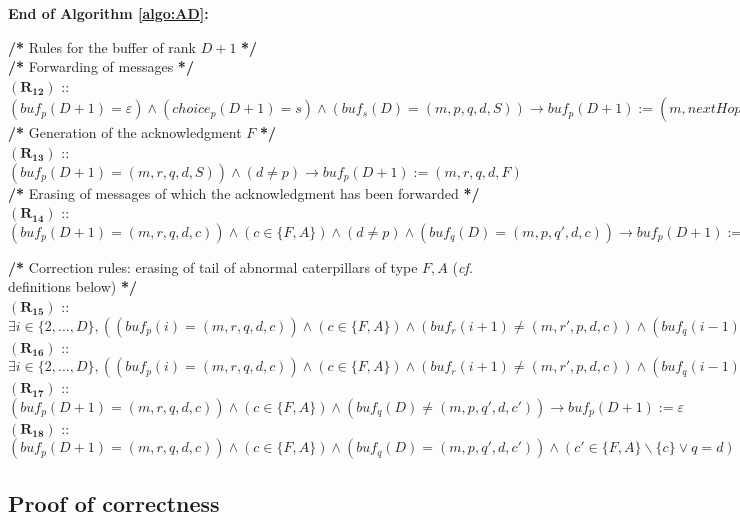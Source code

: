 \documentclass[11pt]{article}
\begin{document}
\begin{algorithm}
	\begin{description}
		\item \textbf{End of Algorithm \ref{algo:AD}:}
\small{
			\item \textbf{/*} Rules for the buffer of rank $D+1$ \textbf{*/}\\
			\textbf{/*} Forwarding of messages \textbf{*/}\\
			$\boldsymbol{(R_{12})}$ :: $(buf_{p}(D+1)=\varepsilon) \wedge (choice_{p}(D+1)=s) \wedge (buf_{s}(D)=(m,p,q,d,S))\longrightarrow buf_{p}(D+1):=(m,nextHop_{p}(d),s,d,S)$ 
			\textbf{/*} Generation of the acknowledgment $F$ \textbf{*/}\\
			$\boldsymbol{(R_{13})}$ :: $(buf_{p}(D+1)=(m,r,q,d,S)) \wedge (d\neq p)\longrightarrow buf_{p}(D+1):=(m,r,q,d,F)$ \\
			\textbf{/*} Erasing of messages of which the acknowledgment has been forwarded \textbf{*/}\\
			$\boldsymbol{(R_{14})}$ :: $(buf_{p}(D+1)=(m,r,q,d,c)) \wedge (c\in\{F,A\}) \wedge (d\neq p) \wedge (buf_{q}(D)=(m,p,q',d,c))\longrightarrow buf_{p}(D+1):=\varepsilon$ 
		\item \textbf{/*} Correction rules: erasing of tail of abnormal caterpillars of type $F,A$ (\emph{cf.} definitions below) \textbf{*/}\\
			$\boldsymbol{(R_{15})}$ :: $\exists i\in\{2,...,D\},((buf_{p}(i)=(m,r,q,d,c)) \wedge (c\in\{F,A\})
			\wedge (buf_{r}(i+1)\neq(m,r',p,d,c)) \wedge (buf_{q}(i-1)\neq(m,p,q',d,c')))\longrightarrow buf_{p}(i):=\varepsilon$ \\
			$\boldsymbol{(R_{16})}$ :: $\exists i\in\{2,...,D\},((buf_{p}(i)=(m,r,q,d,c)) \wedge (c\in\{F,A\}) \wedge (buf_{r}(i+1)\neq(m,r',p,d,c)) 
			\wedge (buf_{q}(i-1)=(m,p,q',d,c')) \wedge (c'\in\{F,A\}\backslash\{c\} \vee q=d)) \longrightarrow buf_{p}(i):=\varepsilon$ \\
			$\boldsymbol{(R_{17})}$ :: $(buf_{p}(D+1)=(m,r,q,d,c)) \wedge (c\in\{F,A\}) \wedge (buf_{q}(D)\neq(m,p,q',d,c'))\longrightarrow buf_{p}(D+1):=\varepsilon$ \\
			$\boldsymbol{(R_{18})}$ :: $(buf_{p}(D+1)=(m,r,q,d,c)) \wedge (c\in\{F,A\}) \wedge (buf_{q}(D)=(m,p,q',d,c')) \wedge (c'\in\{F,A\}\backslash\{c\} \vee q=d)\longrightarrow buf_{p}(D+1):=\varepsilon$
}
	\end{description}
\end{algorithm}

\subsection{Proof of correctness}
\end{document}
